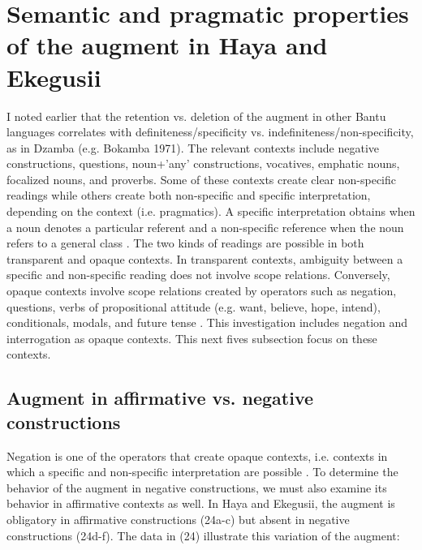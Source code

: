 \documentclass[output=paper]{langscibook}
\begin{document}
\section{Semantic and pragmatic properties of the augment in Haya and Ekegusii}
 I noted earlier that the retention vs. deletion of the augment in other Bantu languages correlates with definiteness/specificity vs. indefiniteness/non-specificity, as in Dzamba (e.g. Bokamba 1971). The relevant contexts include negative constructions, questions, noun+’any’ constructions, vocatives, emphatic nouns, focalized nouns, and proverbs. Some of these contexts create clear non-specific readings while others create both non-specific and specific interpretation, depending on the context (i.e. pragmatics). A specific interpretation obtains when a noun denotes a particular referent and a non-specific reference when the noun refers to a general class \citep[chapter 4]{lyons1999definiteness}. The two kinds of readings are possible in both transparent and opaque contexts. In transparent contexts, ambiguity between a specific and non-specific reading does not involve scope relations. Conversely, opaque contexts involve scope relations created by operators such as negation, questions, verbs of propositional attitude (e.g. want, believe, hope, intend), conditionals, modals, and future tense \citep[166-78]{lyons1999definiteness}. This investigation includes negation and interrogation as opaque contexts. This next fives subsection focus on these contexts.

\subsection{Augment in affirmative vs. negative constructions}
Negation is one of the operators that create opaque contexts, i.e. contexts in which a specific and non-specific interpretation are possible \citep{lyons1999definiteness}. To determine the behavior of the augment in negative constructions, we must also examine its behavior in affirmative contexts as well. In Haya and Ekegusii, the augment is obligatory in affirmative constructions (24a-c) but absent in negative constructions (24d-f). The data in (24) illustrate this variation of the augment:
\end{document}
